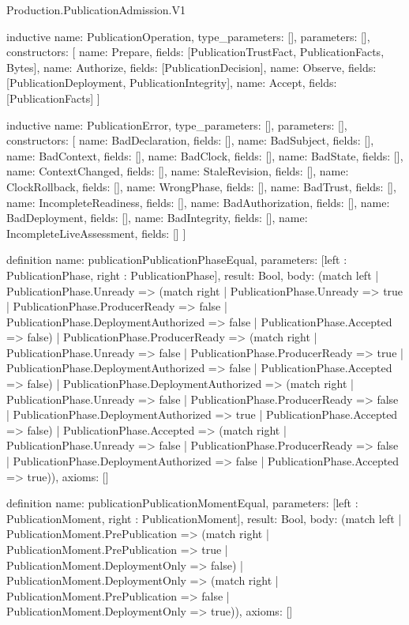 \begin{lexlean}{Production.PublicationAdmission.V1}
\begin{semanticmodule}
inductive{
  name: PublicationOperation,
  type_parameters: [],
  parameters: [],
  constructors: [
    {name: Prepare, fields: [PublicationTrustFact, PublicationFacts, Bytes]},
    {name: Authorize, fields: [PublicationDecision]},
    {name: Observe, fields: [PublicationDeployment, PublicationIntegrity]},
    {name: Accept, fields: [PublicationFacts]}
  ]
}

inductive{
  name: PublicationError,
  type_parameters: [],
  parameters: [],
  constructors: [
    {name: BadDeclaration, fields: []},
    {name: BadSubject, fields: []},
    {name: BadContext, fields: []},
    {name: BadClock, fields: []},
    {name: BadState, fields: []},
    {name: ContextChanged, fields: []},
    {name: StaleRevision, fields: []},
    {name: ClockRollback, fields: []},
    {name: WrongPhase, fields: []},
    {name: BadTrust, fields: []},
    {name: IncompleteReadiness, fields: []},
    {name: BadAuthorization, fields: []},
    {name: BadDeployment, fields: []},
    {name: BadIntegrity, fields: []},
    {name: IncompleteLiveAssessment, fields: []}
  ]
}

definition{
  name: publicationPublicationPhaseEqual,
  parameters: [left : PublicationPhase, right : PublicationPhase],
  result: Bool,
  body: (match left
    | PublicationPhase.Unready => (match right
      | PublicationPhase.Unready => true
      | PublicationPhase.ProducerReady => false
      | PublicationPhase.DeploymentAuthorized => false
      | PublicationPhase.Accepted => false)
    | PublicationPhase.ProducerReady => (match right
      | PublicationPhase.Unready => false
      | PublicationPhase.ProducerReady => true
      | PublicationPhase.DeploymentAuthorized => false
      | PublicationPhase.Accepted => false)
    | PublicationPhase.DeploymentAuthorized => (match right
      | PublicationPhase.Unready => false
      | PublicationPhase.ProducerReady => false
      | PublicationPhase.DeploymentAuthorized => true
      | PublicationPhase.Accepted => false)
    | PublicationPhase.Accepted => (match right
      | PublicationPhase.Unready => false
      | PublicationPhase.ProducerReady => false
      | PublicationPhase.DeploymentAuthorized => false
      | PublicationPhase.Accepted => true)),
  axioms: []
}

definition{
  name: publicationPublicationMomentEqual,
  parameters: [left : PublicationMoment, right : PublicationMoment],
  result: Bool,
  body: (match left
    | PublicationMoment.PrePublication => (match right
      | PublicationMoment.PrePublication => true
      | PublicationMoment.DeploymentOnly => false)
    | PublicationMoment.DeploymentOnly => (match right
      | PublicationMoment.PrePublication => false
      | PublicationMoment.DeploymentOnly => true)),
  axioms: []
}


\end{semanticmodule}
\end{lexlean}
